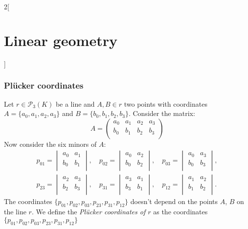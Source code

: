 \documentclass[../../../main.tex]{subfiles}
\begin{document}
\begin{multicols}{2}[\section{Linear geometry}]
  \subsubsection{Plücker coordinates}
  \begin{prop}
    Let $r\in\mathcal{P}_3(K)$ be a line and $A,B\in r$ two points with coordinates $A=\{a_0,a_1,a_2,a_3\}$ and $B=\{b_0,b_1,b_2,b_3\}$. Consider the matrix: $$A=\begin{pmatrix}
        a_0 & a_1 & a_2 & a_3 \\
        b_0 & b_1 & b_2 & b_3 \\
      \end{pmatrix}$$ Now consider the six minors of $A$:
    \begin{gather*}
      p_{01}=\begin{vmatrix}
        a_0 & a_1 \\
        b_0 & b_1 \\
      \end{vmatrix},\quad p_{02}=\begin{vmatrix}
        a_0 & a_2 \\
        b_0 & b_2 \\
      \end{vmatrix},\quad p_{03}=\begin{vmatrix}
        a_0 & a_3 \\
        b_0 & b_3 \\
      \end{vmatrix},\\ p_{23}=\begin{vmatrix}
        a_2 & a_3 \\
        b_2 & b_3 \\
      \end{vmatrix},\quad p_{31}=\begin{vmatrix}
        a_3 & a_1 \\
        b_3 & b_1 \\
      \end{vmatrix},\quad p_{12}=\begin{vmatrix}
        a_1 & a_2 \\
        b_1 & b_2 \\
      \end{vmatrix}.
    \end{gather*}
    The coordinates $\{p_{01},p_{02},p_{03},p_{23},p_{31},p_{12}\}$ doesn't depend on the points $A$, $B$ on the line $r$. We define the \textit{Plücker coordinates of $r$} as the coordinates $\{p_{01},p_{02},p_{03},p_{23},p_{31},p_{12}\}$

\end{prop}
\end{multicols}
\end{document}
